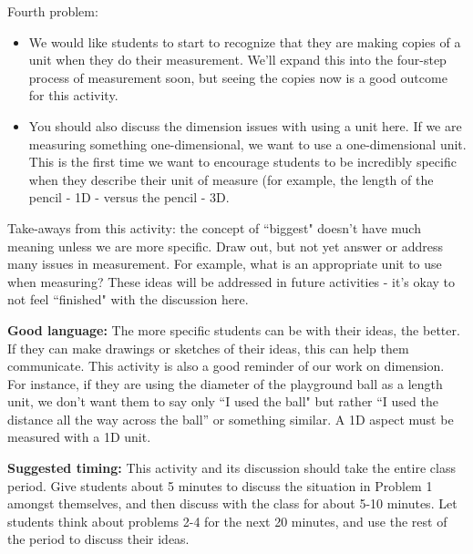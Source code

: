 \documentclass[nooutcomes,noauthor, handout]{ximera}
\begin{document}
\begin{instructorNotes}
Fourth problem:
\begin{itemize}
        \item We would like students to start to recognize that they are making copies of a unit when they do their measurement. We'll expand this into the four-step process of measurement soon, but seeing the copies now is a good outcome for this activity.
        \item You should also discuss the dimension issues with using a unit here. If we are measuring something one-dimensional, we want to use a one-dimensional unit. This is the first time we want to encourage students to be incredibly specific when they describe their unit of measure (for example, the length of the pencil - 1D - versus the pencil - 3D.
\end{itemize}




Take-aways from this activity: the concept of ``biggest" doesn't have much meaning unless we are more specific.  Draw out, but not yet answer or address many issues in measurement.  For example, what is an appropriate unit to use when measuring?  These ideas will be addressed in future activities - it's okay to not feel ``finished" with the discussion here.

{\bf Good language:} The more specific students can be with their ideas, the better. If they can make drawings or sketches of their ideas, this can help them communicate. This activity is also a good reminder of our work on dimension. For instance, if they are using the diameter of the playground ball as a length unit, we don't want them to say only ``I used the ball" but rather ``I used the distance all the way across the ball'' or something similar. A 1D aspect must be measured with a 1D unit.

{\bf Suggested timing:} This activity and its discussion should take the entire class period.  Give students about 5 minutes to discuss the situation in Problem 1 amongst themselves, and then discuss with the class for about 5-10 minutes.  Let students think about problems 2-4 for the next 20 minutes, and use the rest of the period to discuss their ideas.

\end{instructorNotes}
\end{document}
